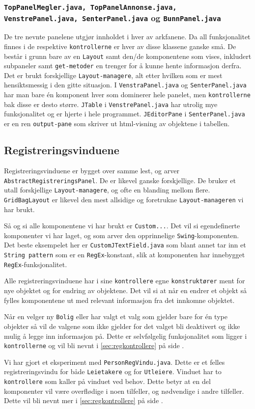 \subsubsection*{\texttt{TopPanelMegler.java, TopPanelAnnonse.java, VenstrePanel.java, SenterPanel.java} og \texttt{BunnPanel.java}}
De tre nevnte panelene utgjør innholdet i hver av arkfanene. 
Da all funksjonalitet finnes i de respektive \texttt{kontrollerne} er hver av disse klassene ganske små. De består i grunn bare av en \texttt{Layout} samt den/de komponentene som vises, inkludert subpaneler samt \texttt{get-metoder} en trenger for å kunne hente informasjon derfra.
Det er brukt forskjellige \texttt{Layout-managere}, alt etter hvilken som er mest hensiktsmessig i den gitte situasjon.
I \texttt{VenstraPanel.java} og \texttt{SenterPanel.java} har man bare én komponent hver som dominerer hele panelet, men \texttt{kontrollerne} bak disse er desto større.
\texttt{JTable} i \texttt{VenstrePanel.java} har utrolig mye funksjonalitet og er hjerte i hele programmet.
\texttt{JEditorPane} i \texttt{SenterPanel.java} er en ren \texttt{output-pane} som skriver ut html-visning av objektene i tabellen. 


\subsection{Registreringsvinduene}
Registreringsvinduene er bygget over samme lest, og arver \texttt{AbstractRegistreringsPanel}. De er likevel ganske forskjellige. De bruker et utall forskjellige \texttt{Layout-managere}, og ofte en blanding mellom flere. 
\texttt{GridBagLayout} er likevel den mest allsidige og foretrukne \texttt{Layout-manageren} vi har brukt. 

Så og si alle komponentene vi har brukt er \texttt{Custom...}. Det vil si egendefinerte komponenter vi har laget, og som arver den opprinnelige \texttt{Swing}-komponenten. 
Det beste eksempelet her er \texttt{CustomJTextField.java} som blant annet tar inn et \texttt{String pattern} som er en \texttt{RegEx}-konstant, slik at komponenten har innebygget \texttt{RegEx}-funksjonalitet.

Alle registreringsvinduene har i sine \texttt{kontrollere} egne \texttt{konstruktører} ment for nye objektet og for endring av objektene. Det vil si at når en endrer et objekt så fylles komponentene ut med relevant informasjon fra det innkomne objektet.

Når en velger ny \texttt{Bolig} eller har valgt et valg som gjelder bare for én type objekter så vil de valgene som ikke gjelder for det valget bli deaktivert og ikke mulig å legge inn informasjon på. Dette er selvfølgelig funksjonalitet som ligger i \texttt{kontrollerne} og vil bli nevnt i \ref{sec:regkontrollere} på side \pageref{sec:regkontrollere}.

Vi har gjort et eksperiment med \texttt{PersonRegVindu.java}. 
Dette er et felles registreringsvindu for både \texttt{Leietakere} og for \texttt{Utleiere}. Vinduet har to \texttt{kontrollere} som kaller på vinduet ved behov.
Dette betyr at en del komponenter vil være overflødige i noen tilfeller, og nødvendige i andre tilfeller. Dette vil bli nevnt mer i \ref{sec:regkontrollere} på side \pageref{sec:regkontrollere}.

